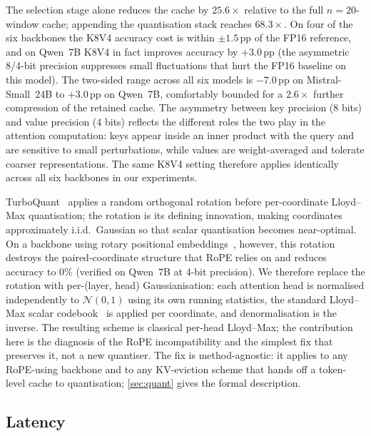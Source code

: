 The selection stage alone reduces the cache by $25.6\times$ relative to the full $n{=}20$-window cache; appending the quantisation stack reaches $68.3\times$. On four of the six backbones the K8V4 accuracy cost is within $\pm 1.5$\,pp of the FP16 reference, and on Qwen~7B K8V4 in fact improves accuracy by $+3.0$\,pp (the asymmetric 8/4-bit precision suppresses small fluctuations that hurt the FP16 baseline on this model). The two-sided range across all six models is $-7.0$\,pp on Mistral-Small~24B to $+3.0$\,pp on Qwen~7B, comfortably bounded for a $2.6\times$ further compression of the retained cache. The asymmetry between key precision (8 bits) and value precision (4 bits) reflects the different roles the two play in the attention computation: keys appear inside an inner product with the query and are sensitive to small perturbations, while values are weight-averaged and tolerate coarser representations. The same K8V4 setting therefore applies identically across all six backbones in our experiments.

TurboQuant~\cite{zandieh2026turboquant} applies a random orthogonal rotation before per-coordinate Lloyd--Max quantisation; the rotation is its defining innovation, making coordinates approximately i.i.d.\ Gaussian so that scalar quantisation becomes near-optimal. On a backbone using rotary positional embeddings~\cite{su2024rope}, however, this rotation destroys the paired-coordinate structure that RoPE relies on and reduces accuracy to $0\%$ (verified on Qwen~7B at 4-bit precision). We therefore replace the rotation with per-(layer, head) Gaussianisation: each attention head is normalised independently to $\mathcal{N}(0,1)$ using its own running statistics, the standard Lloyd--Max scalar codebook~\cite{lloyd1982least,max1960quantizing} is applied per coordinate, and denormalisation is the inverse. The resulting scheme is classical per-head Lloyd--Max; the contribution here is the diagnosis of the RoPE incompatibility and the simplest fix that preserves it, not a new quantiser. The fix is method-agnostic: it applies to any RoPE-using backbone and to any KV-eviction scheme that hands off a token-level cache to quantisation; \cref{sec:quant} gives the formal description.


\subsection{Latency}\label{sec:latency}

